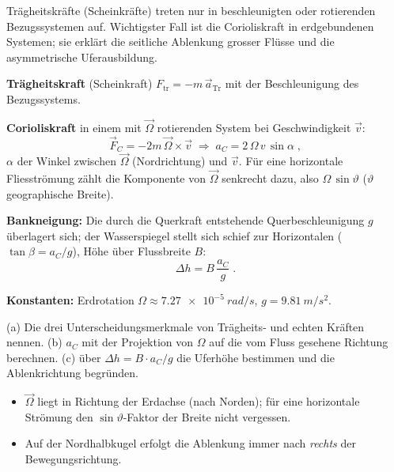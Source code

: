 
Trägheitskräfte (Scheinkräfte) treten nur in beschleunigten oder rotierenden
Bezugssystemen auf. Wichtigster Fall ist die Corioliskraft in erdgebundenen
Systemen; sie erklärt die seitliche Ablenkung grosser Flüsse und die
asymmetrische Uferausbildung.

\begin{werkzeugkasten}[Werkzeuge]
\textbf{Trägheitskraft} (Scheinkraft) $F_\mathrm{tr} = -m\,\vec a_\mathrm{Tr}$
mit der Beschleunigung des Bezugssystems.

\textbf{Corioliskraft} in einem mit $\vec\Omega$ rotierenden System bei
Geschwindigkeit $\vec v$:
\begin{equation}
  \vec F_C = -2m\,\vec\Omega\times\vec v
  \;\Rightarrow\;
  a_C = 2\,\Omega\,v\,\sin\alpha\;,
\end{equation}
$\alpha$ der Winkel zwischen $\vec\Omega$ (Nordrichtung) und $\vec v$. Für eine
horizontale Fliesströmung zählt die Komponente von $\vec\Omega$ senkrecht dazu,
also $\Omega\,\sin\vartheta$ ($\vartheta$ geographische Breite).

\textbf{Bankneigung:} Die durch die Querkraft entstehende Querbeschleunigung
$g$ überlagert sich; der Wasserspiegel stellt sich schief zur
Horizontalen ($\tan\beta = a_C/g$), Höhe über Flussbreite $B$:
\begin{equation}
  \Delta h = B\,\frac{a_C}{g}\;.
\end{equation}

\textbf{Konstanten:} Erdrotation $\Omega\approx\qty{7.27e-5}{rad/s}$,
$g=\qty{9.81}{m/s^2}$.
\end{werkzeugkasten}

\begin{werkzeugkasten}
(a) Die drei Unterscheidungsmerkmale von Trägheits- und echten Kräften
nennen. (b) $a_C$ mit der Projektion von $\Omega$ auf die vom Fluss gesehene
Richtung berechnen. (c) über $\Delta h=B\cdot a_C/g$ die Uferhöhe bestimmen und
die Ablenkrichtung begründen.
\end{werkzeugkasten}

\begin{achtung}
\begin{itemize}
  \item $\vec\Omega$ liegt in Richtung der Erdachse (nach Norden); für eine
       horizontale Strömung den $\sin\vartheta$-Faktor der Breite nicht
       vergessen.
  \item Auf der Nordhalbkugel erfolgt die Ablenkung immer nach \emph{rechts}
       der Bewegungsrichtung.
\end{itemize}
\end{achtung}
